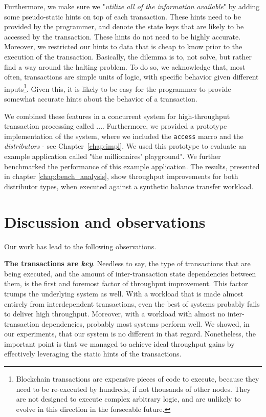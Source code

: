 Furthermore, we make sure we "\textit{utilize all of the information available}" by adding some
pseudo-static hints on top of each transaction. These hints need to be provided by the programmer,
and denote the state keys that are likely to be accessed by the transaction. These hints do not need
to be highly accurate. Moreover, we restricted our hints to data that is cheap to know prior to the
execution of the transaction. Basically, the dilemma is to, not solve, but rather find a way around
the halting problem\cite{burkholderHaltingProblem1987}. To do so, we acknowledge that, most often,
transactions are simple units of logic, with specific behavior given different
inputs\footnote{Blockchain transactions are expensive pieces of code to execute, because they need
to be re-executed by hundreds, if not thousands of other nodes. They are not designed to execute
complex arbitrary logic, and are unlikely to evolve in this direction in the forseeable future.}.
Given this, it is likely to be easy for the programmer to provide somewhat accurate hints about the
behavior of a transaction.

We combined these features in a concurrent system for high-throughput transaction processing called ....
Furthermore, we provided a prototype implementation of the system, where we included
the \texttt{access} macro and the \textit{distributors} - see Chapter~\ref{chap:impl}.
We used this prototype to evaluate an example application called "the millionaires' playground".
We further benchmarked the performance of this example application. The results, presented
in chapter \ref{chap:bench_analysis}, show throughput improvements for both
distributor types, when executed against a synthetic balance transfer workload.

\section{Discussion and observations} \label{chap_conc:sec:discussion}

Our work has lead to the following observations.

\textbf{The transactions are \textit{key}}. Needless to say, the type of transactions that are being
executed, and the amount of inter-transaction state dependencies between them, is the first and
foremost factor of throughput improvement. This factor trumps the underlying system as well. With a workload that
is made almost entirely from interdependent transactions, even the best of systems probably fails to
deliver high throughput. Moreover, with a workload with almost no inter-transaction dependencies,
probably most systems perform well. We showed, in our experiments, that our system is no different
in that regard. Nonetheless, the important point is that we managed to achieve ideal throughput
gains by effectively leveraging the static hints of the transactions.

